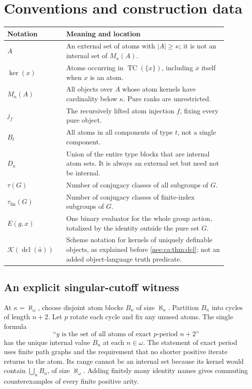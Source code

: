 \documentclass[11pt,letterpaper]{article}
\numberwithin{equation}{section}
\theoremstyle{plain}
\theoremstyle{definition}
\theoremstyle{remark}
\newcommand{\kerat}{\operatorname{ker}}
\newcommand{\TC}{\operatorname{TC}}
\newcommand{\Mk}{M_\kappa(A)}
\newcommand{\dcl}{\operatorname{dcl}}
\begin{document}
\setcounter{section}{3}
\renewcommand{\thesection}{\Alph{section}}
\renewcommand{\theHsection}{ca.app.\Alph{section}}
\makeatletter\gdef\Hy@chapapp{\Hy@appendixstring}\makeatother

\section{Conventions and construction data}\label{nee:ca:app:conventions}

\begin{longtable}{@{}L{0.24\linewidth}L{0.66\linewidth}@{}}
\toprule
Notation & Meaning and location \\
\midrule
\endhead
$A$ & An external set of atoms with $|A|\geq\kappa$; it is not an internal set of $\Mk$. \\[4pt]
$\kerat(x)$ & Atoms occurring in $\TC(\{x\})$, including $x$ itself when $x$ is an atom. \\[4pt]
$\Mk$ & All objects over $A$ whose atom kernels have cardinality below $\kappa$. Pure ranks are unrestricted. \\[4pt]
$j_f$ & The recursively lifted atom injection $f$, fixing every pure object. \\[4pt]
$B_t$ & All atoms in all components of type $t$, not a single component. \\[4pt]
$D_\kappa$ & Union of the entire type blocks that are internal atom sets. It is always an external set but need not be internal. \\[4pt]
$\tau(G)$ & Number of conjugacy classes of all subgroups of $G$. \\[4pt]
$\tau_{\mathrm{fin}}(G)$ & Number of conjugacy classes of finite-index subgroups of $G$. \\[4pt]
$E(g,x)$ & One binary evaluator for the whole group action, totalized by the identity outside the pure set $G$. \\[4pt]
$\mathcal K(\dcl(\bar a))$ & Scheme notation for kernels of uniquely definable objects, as explained before \cref{nee:ca:thm:dcl}; not an added object-language truth predicate. \\
\bottomrule
\end{longtable}

\subsection{An explicit singular-cutoff witness}

At $\kappa=\aleph_\omega$, choose disjoint atom blocks $B_n$ of size $\aleph_n$. Partition $B_n$ into cycles of length $n+2$. Let $p$ rotate each cycle and fix any unused atoms. The single formula
\[
\text{``$y$ is the set of all atoms of exact $p$-period $n+2$''}
\]
has the unique internal value $B_n$ at each $n\in\omega$. The statement of exact period uses finite path graphs and the requirement that no shorter positive iterate returns to the atom. Its range cannot be an internal set because its kernel would contain $\bigcup_n B_n$, of size $\aleph_\omega$. Adding finitely many identity names gives commuting counterexamples of every finite positive arity.
\end{document}
